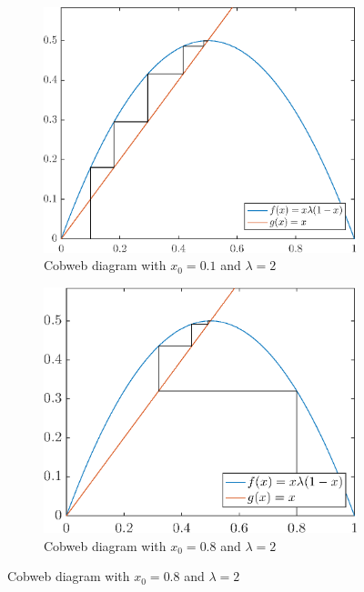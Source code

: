 \documentclass[12pt,oneside,a4paper]{article}
\numberwithin{equation}{section}
\begin{document}
{{{{\begin{figure}
	\centering
	\begin{subfigure}{0.45\textwidth}
		\includegraphics[width=\linewidth]{cobweb_x1_l20_iter50}
		\caption{Cobweb diagram with $x_0=0.1$ and $\lambda=2$}
		\label{cobx1l20}
	\end{subfigure}\hfill
	\begin{subfigure}{.45\textwidth}
	\centering
			\includegraphics[width=\linewidth]{cobweb_x8_l20_iter50}
	\caption{Cobweb diagram with $x_0=0.8$ and $\lambda=2$}
	\label{cobx8l20}
\end{subfigure}
\end{figure}

}}}}
\end{document}
